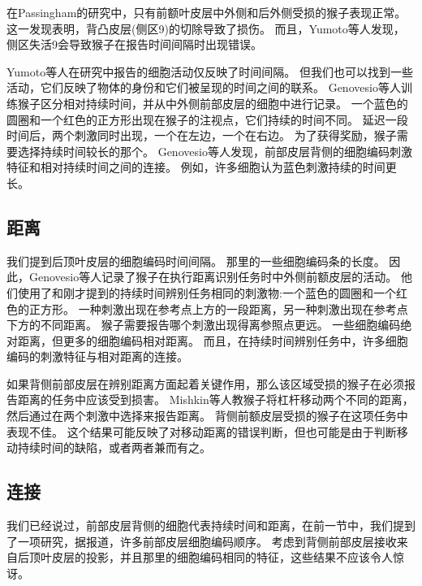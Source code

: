 在Passingham\cite{passingham1978information}的研究中，只有前额叶皮层中外侧和后外侧受损的猴子表现正常。
这一发现表明，背凸皮层(侧区9)的切除导致了损伤。
而且，Yumoto等人\cite{yumoto2011neural}发现，侧区失活9会导致猴子在报告时间间隔时出现错误。


Yumoto等人在研究中报告的细胞活动仅反映了时间间隔。
但我们也可以找到一些活动，它们反映了物体的身份和它们被呈现的时间之间的联系。
Genovesio等人\cite{genovesio2009feature}训练猴子区分相对持续时间，并从中外侧前部皮层的细胞中进行记录。
一个蓝色的圆圈和一个红色的正方形出现在猴子的注视点，它们持续的时间不同。
延迟一段时间后，两个刺激同时出现，一个在左边，一个在右边。
为了获得奖励，猴子需要选择持续时间较长的那个。
Genovesio等人发现，前部皮层背侧的细胞编码刺激特征和相对持续时间之间的连接。
例如，许多细胞认为蓝色刺激持续的时间更长。


\subsection{距离}

我们提到后顶叶皮层的细胞编码时间间隔\cite{leon2003representation}。
那里的一些细胞编码条的长度\cite{tudusciuc2007neuronal}。
因此，Genovesio等人\cite{genovesio2011prefrontal}记录了猴子在执行距离识别任务时中外侧前额皮层的活动。
他们使用了和刚才提到的持续时间辨别任务相同的刺激物:一个蓝色的圆圈和一个红色的正方形。
一种刺激出现在参考点上方的一段距离，另一种刺激出现在参考点下方的不同距离。
猴子需要报告哪个刺激出现得离参照点更远。
一些细胞编码绝对距离，但更多的细胞编码相对距离。
而且，在持续时间辨别任务中，许多细胞编码的刺激特征与相对距离的连接。


如果背侧前部皮层在辨别距离方面起着关键作用，那么该区域受损的猴子在必须报告距离的任务中应该受到损害。
Mishkin等人\cite{mishkin1977kinesthetic}教猴子将杠杆移动两个不同的距离，然后通过在两个刺激中选择来报告距离。
背侧前额皮层受损的猴子在这项任务中表现不佳。
这个结果可能反映了对移动距离的错误判断，但也可能是由于判断移动持续时间的缺陷，或者两者兼而有之。



\subsection{连接}

我们已经说过，前部皮层背侧的细胞代表持续时间和距离，在前一节中，我们提到了一项研究，据报道，许多前部皮层细胞编码顺序\cite{ninokura2003representation,genovesio2009feature}。
考虑到背侧前部皮层接收来自后顶叶皮层的投影，并且那里的细胞编码相同的特征，这些结果不应该令人惊讶\cite{tudusciuc2007neuronal,bueti2009parietal}。


